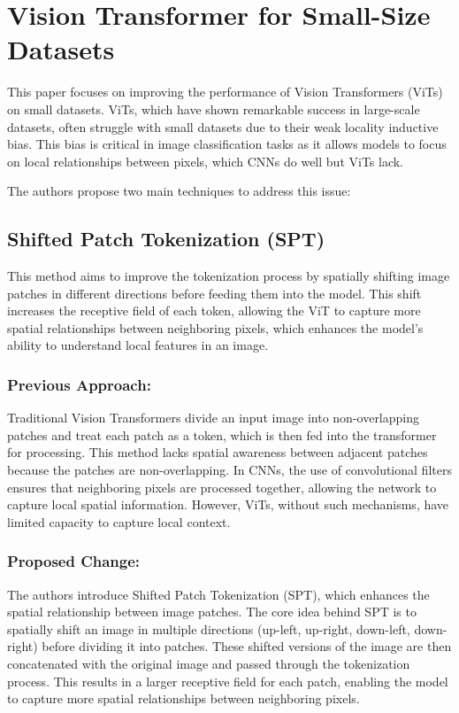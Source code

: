 \documentclass{report}
\begin{document}
	
	
	
	
	
	
	\chapter{Vision Transformer for Small-Size Datasets \cite{DBLP:journals/corr/abs-2112-13492}}
	This paper focuses on improving the performance of Vision Transformers (ViTs) on small datasets. ViTs, which have shown remarkable success in large-scale datasets, often struggle with small datasets due to their weak locality inductive bias. This bias is critical in image classification tasks as it allows models to focus on local relationships between pixels, which CNNs do well but ViTs lack.
	
	The authors propose two main techniques to address this issue:
	
	\section{Shifted Patch Tokenization (SPT)}
	This method aims to improve the tokenization process by spatially shifting image patches in different directions before feeding them into the model. This shift increases the receptive field of each token, allowing the ViT to capture more spatial relationships between neighboring pixels, which enhances the model's ability to understand local features in an image.
	
	\subsection{Previous Approach:}
	Traditional Vision Transformers divide an input image into non-overlapping patches and treat each patch as a token, which is then fed into the transformer for processing. This method lacks spatial awareness between adjacent patches because the patches are non-overlapping. In CNNs, the use of convolutional filters ensures that neighboring pixels are processed together, allowing the network to capture local spatial information. However, ViTs, without such mechanisms, have limited capacity to capture local context.
	
	\subsection{Proposed Change:}
	The authors introduce Shifted Patch Tokenization (SPT), which enhances the spatial relationship between image patches. The core idea behind SPT is to spatially shift an image in multiple directions (up-left, up-right, down-left, down-right) before dividing it into patches. These shifted versions of the image are then concatenated with the original image and passed through the tokenization process. This results in a larger receptive field for each patch, enabling the model to capture more spatial relationships between neighboring pixels.
	
\end{document}
